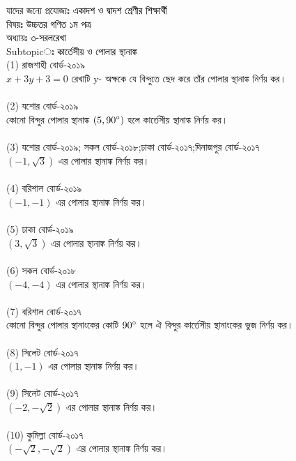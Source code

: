 \documentclass{article}
\begin{document}
 
	\Large
	যাদের জন্যে প্রযোজ্যঃ  	\textcolor{black}{একাদশ ও দ্বাদশ শ্রেণীর শিক্ষার্থী} \\
	বিষয়ঃ \textcolor{black}{উচ্চতর গণিত ১ম পত্র} \\
	অধ্যায়ঃ \textcolor{black}{৩-সরলরেখা }\\ 
	Subtopicঃ \textcolor{black}{কার্তেসীয় ও পোলার স্থানাঙ্ক }\\	
	(1) রাজশাহী বোর্ড-২০১৯\\
	$x+3y+3=0$ রেখাটি y- অক্ষকে যে বিন্দুতে ছেদ করে তাঁর পোলার স্থানাঙ্ক নির্ণয় কর। \\
	\\
	(2) যশোর বোর্ড-২০১৯\\
	কোনো বিন্দুর পোলার স্থানাঙ্ক $(5,90\degree)$ হলে কার্তেসীয় স্থানাঙ্ক নির্ণয় কর। \\
	\\
	(3) যশোর বোর্ড-২০১৯; সকল বোর্ড-২০১৮;ঢাকা বোর্ড-২০১৭;দিনাজপুর বোর্ড-২০১৭\\
	$(-1,\sqrt{3})$ এর পোলার স্থানাঙ্ক নির্ণয় কর। \\
	\\
	(4) বরিশাল বোর্ড-২০১৯\\
	$(-1,-1)$ এর পোলার স্থানাঙ্ক নির্ণয় কর।\\
	\\
	(5) ঢাকা বোর্ড-২০১৯\\
	$(3,\sqrt{3})$ এর পোলার স্থানাঙ্ক নির্ণয় কর। \\
	\\
	(6) সকল বোর্ড-২০১৮\\
	$(-4,-4)$ এর পোলার স্থানাঙ্ক নির্ণয় কর। \\
	\\
	 (7) বরিশাল বোর্ড-২০১৭\\
	কোনো বিন্দুর পোলার স্থানাংকের কোটি $90\degree$ হলে ঐ বিন্দুর কার্তেসীয় স্থানাংকের ভুজ নির্ণয় কর।\\
	\\
		(8) সিলেট বোর্ড-২০১৭\\
	$(1,-1)$ এর পোলার স্থানাঙ্ক নির্ণয় কর। \\ 
	\\  
		(9) সিলেট বোর্ড-২০১৭\\
	$(-2,-\sqrt{2})$ এর পোলার স্থানাঙ্ক নির্ণয় কর। \\
	\\   
		(10) কুমিল্লা বোর্ড-২০১৭\\
	$(-\sqrt{2},-\sqrt{2})$ এর পোলার স্থানাঙ্ক নির্ণয় কর। \\   
\end{document}
